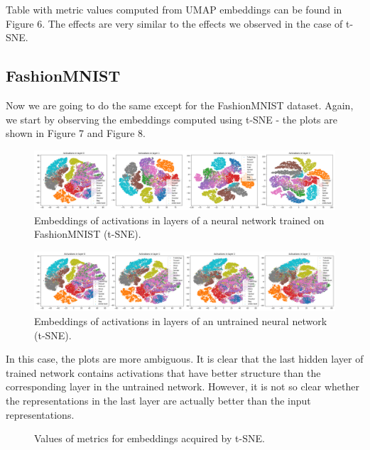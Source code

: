 \documentclass{article}
\begin{document}
Table with metric values computed from UMAP embeddings can be found in
Figure 6. The effects are very similar to the effects we observed in the case
of t-SNE.

\subsection{FashionMNIST}
Now we are going to do the same except for the FashionMNIST dataset. Again, we
start by observing the embeddings computed using t-SNE - the plots are
shown in Figure 7 and Figure 8.

\begin{figure}
  \centering
    \includegraphics[width=1.0\textwidth]{../../out/activations_feedforward/fmnist_t-sne_trained.png}
    \caption{Embeddings of activations in layers of a neural network trained on FashionMNIST (t-SNE).}
\end{figure}

\begin{figure}
  \centering
    \includegraphics[width=1.0\textwidth]{../../out/activations_feedforward/fmnist_t-sne_untrained.png}
  \caption{Embeddings of activations in layers of an untrained neural network (t-SNE).}
\end{figure}

In this case, the plots are more ambiguous. It is clear that the last
hidden layer of trained network contains activations that have better
structure than the corresponding layer in the untrained network. However, it is
not so clear whether the representations in the last layer are actually
better than the input representations.

\begin{figure}
  \centering
    \resizebox{\textwidth}{!}{
        
    }
  \caption{Values of metrics for embeddings acquired by t-SNE.}
\end{figure}
\end{document}
